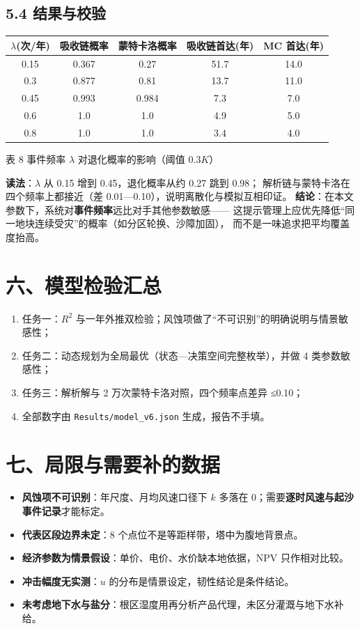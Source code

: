 \documentclass[11pt,a4paper]{ctexart}
\begin{document}
\subsection*{5.4 结果与校验}
\begin{table}[H]\centering\small
\begin{tabular}{|c|c|c|c|c|}
\toprule
$\lambda$(次/年) & 吸收链概率 & 蒙特卡洛概率 & 吸收链首达(年) & MC 首达(年) \\
\midrule
0.15 & 0.367 & 0.27 & 51.7 & 14.0 \\
0.3 & 0.877 & 0.81 & 13.7 & 11.0 \\
0.45 & 0.993 & 0.984 & 7.3 & 7.0 \\
0.6 & 1.0 & 1.0 & 4.9 & 5.0 \\
0.8 & 1.0 & 1.0 & 3.4 & 4.0 \\
\bottomrule
\end{tabular}
\begin{center}\small 表 8  事件频率 $\lambda$ 对退化概率的影响（阈值 $0.3K$）\end{center}
\end{table}
\textbf{读法}：$\lambda$ 从 0.15 增到 0.45，退化概率从约 0.27 跳到 0.98；
解析链与蒙特卡洛在四个频率上都接近（差 0.01—0.10），说明离散化与模拟互相印证。
\textbf{结论}：在本文参数下，系统对\textbf{事件频率}远比对手其他参数敏感——
这提示管理上应优先降低“同一地块连续受灾”的概率（如分区轮换、沙障加固），
而不是一味追求把平均覆盖度抬高。

\section*{六、模型检验汇总}
\begin{enumerate}
\item 任务一：$R^2$ 与一年外推双检验；风蚀项做了“不可识别”的明确说明与情景敏感性；
\item 任务二：动态规划为全局最优（状态—决策空间完整枚举），并做 4 类参数敏感性；
\item 任务三：解析解与 2 万次蒙特卡洛对照，四个频率点差异 ≤0.10；
\item 全部数字由 \texttt{Results/model\_v6.json} 生成，报告不手填。
\end{enumerate}

\section*{七、局限与需要补的数据}
\begin{itemize}
\item \textbf{风蚀项不可识别}：年尺度、月均风速口径下 $k$ 多落在 0；需要\textbf{逐时风速与起沙事件记录}才能标定。
\item \textbf{代表区段边界未定}：8 个点位不是等距样带，塔中为腹地背景点。
\item \textbf{经济参数为情景假设}：单价、电价、水价缺本地依据，NPV 只作相对比较。
\item \textbf{冲击幅度无实测}：$u$ 的分布是情景设定，韧性结论是条件结论。
\item \textbf{未考虑地下水与盐分}：根区湿度用再分析产品代理，未区分灌溉与地下水补给。
\end{itemize}
\end{document}
